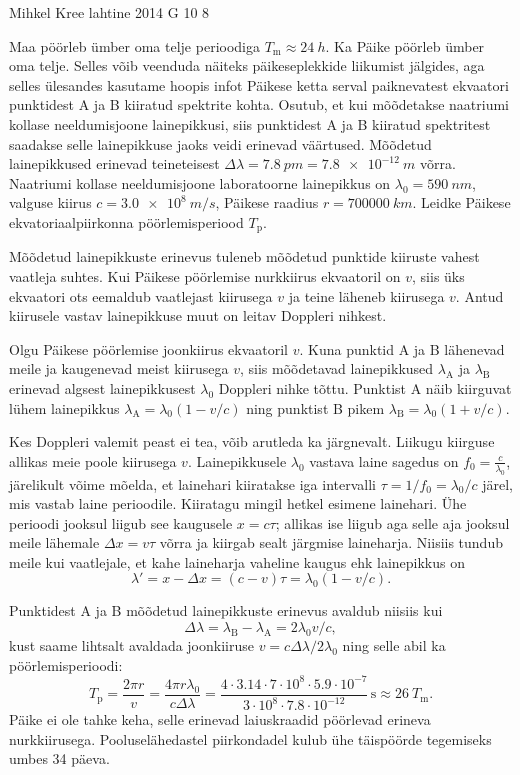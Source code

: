 {Mihkel Kree} %
{lahtine} %
{2014} %
{G 10} %
{8} %
{
\ifStatement
Maa pöörleb ümber oma telje perioodiga $T_\text{m}\approx\SI{24}{h}$. Ka Päike pöörleb ümber oma telje. Selles võib veenduda näiteks päikeseplekkide liikumist jälgides, aga selles ülesandes kasutame hoopis infot Päikese ketta serval paiknevatest ekvaatori punktidest A ja B kiiratud spektrite kohta. Osutub, et kui mõõdetakse naatriumi kollase neeldumisjoone lainepikkusi, siis punktidest A ja B kiiratud spektritest saadakse selle lainepikkuse jaoks veidi erinevad väärtused. Mõõdetud lainepikkused erinevad teineteisest $\Delta \lambda = \SI{7.8}{pm}=\SI{7.8e-12}{m}$ võrra. Naatriumi kollase neeldumisjoone laboratoorne lainepikkus on $\lambda_0=\SI{590}{nm}$, valguse kiirus $c=\SI{3.0e8}{m/s}$, Päikese raadius $r=\SI{700000}{km}$. Leidke Päikese ekvatoriaalpiirkonna pöörlemisperiood $T_\text{p}$.
\fi


\ifHint
Mõõdetud lainepikkuste erinevus tuleneb mõõdetud punktide kiiruste vahest vaatleja suhtes. Kui Päikese pöörlemise nurkkiirus ekvaatoril on $v$, siis üks ekvaatori ots eemaldub vaatlejast kiirusega $v$ ja teine läheneb kiirusega $v$. Antud kiirusele vastav lainepikkuse muut on leitav Doppleri nihkest.
\fi


\ifSolution
Olgu Päikese pöörlemise joonkiirus ekvaatoril $v$. Kuna punktid A ja B lähenevad meile ja kaugenevad meist kiirusega $v$, siis mõõdetavad lainepikkused $\lambda_\text{A}$ ja $\lambda_\text{B}$ erinevad algsest lainepikkusest $\lambda_0$ Doppleri nihke tõttu. Punktist A näib kiirguvat lühem lainepikkus $\lambda_\text{A}=\lambda_0(1-v/c)$ ning punktist B pikem $\lambda_\text{B}=\lambda_0(1+v/c)$.

Kes Doppleri valemit peast ei tea, võib arutleda ka järgnevalt. Liikugu kiirguse allikas meie poole kiirusega $v$. Lainepikkusele $\lambda_0$ vastava laine sagedus on $f_0=\frac{c}{\lambda_0}$, järelikult võime mõelda, et lainehari kiiratakse iga intervalli $\tau = 1/f_0 = \lambda_0/c$ järel, mis vastab laine perioodile. Kiiratagu mingil hetkel esimene lainehari. Ühe perioodi jooksul liigub see kaugusele $x=c\tau$; allikas ise liigub aga selle aja jooksul meile lähemale $\Delta x = v\tau$ võrra ja kiirgab sealt järgmise laineharja. Niisiis tundub meile kui vaatlejale, et kahe laineharja vaheline kaugus ehk lainepikkus on 
\[
\lambda'=x-\Delta x=(c-v)\tau = \lambda_0(1-v/c).
\]

Punktidest A ja B mõõdetud lainepikkuste erinevus avaldub niisiis kui 
\[
\Delta\lambda = \lambda_\text{B}-\lambda_\text{A} = 2\lambda_0 v/c,
\]
kust saame lihtsalt avaldada joonkiiruse $v=c\Delta\lambda/2\lambda_0$ ning selle abil ka pöörlemisperioodi:
\[
T_\text{p}=\frac{2\pi r}{v}=\frac{4 \pi r \lambda_0}{c\Delta \lambda}=
\frac{4 \cdot 3.14 \cdot 7\cdot 10^8 \cdot 5.9 \cdot 10^{-7}}{3\cdot 10^8\cdot 7.8\cdot 10^{-12}}\,\text{s}\approx \SI{26}{\textit{T}_\text{m}}.
\]
Päike ei ole tahke keha, selle erinevad laiuskraadid pöörlevad erineva nurkkiirusega. Pooluselähedastel piirkondadel kulub ühe täispöörde tegemiseks umbes 34 päeva.
\fi


}
